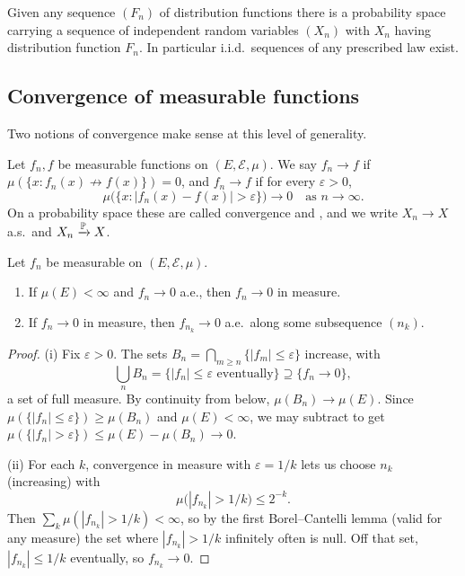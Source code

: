 \documentclass[a4paper]{scrartcl}
\newcommand{\cE}{\mathcal{E}}
\begin{document}
\begin{theorem}\label{thm:construct-iid}
	Given any sequence $(F_n)$ of distribution functions there is a probability space carrying a sequence of independent random variables $(X_n)$ with $X_n$ having distribution function $F_n$. In particular i.i.d.\ sequences of any prescribed law exist.
\end{theorem}

\subsection{Convergence of measurable functions}

Two notions of convergence make sense at this level of generality.

\begin{definition}
	Let $f_n, f$ be measurable functions on $(E,\cE,\mu)$. We say $f_n \to f$  if $\mu(\{x : f_n(x) \not\to f(x)\}) = 0$, and $f_n \to f$  if for every $\varepsilon > 0$,
	$$
	\mu\big( \{ x : |f_n(x) - f(x)| > \varepsilon\}\big) \to 0 \quad \text{as } n \to \infty.
	$$
	On a probability space these are called convergence  and , and we write $X_n \to X$ a.s.\ and $X_n \xrightarrow{\mathbb{P}} X$.
\end{definition}

\begin{theorem}\label{thm:ae-vs-measure}
	Let $f_n$ be measurable on $(E,\cE,\mu)$.
	\begin{enumerate}[label=(\roman*)]
		\item If $\mu(E) < \infty$ and $f_n \to 0$ a.e., then $f_n \to 0$ in measure.
		\item If $f_n \to 0$ in measure, then $f_{n_k} \to 0$ a.e.\ along some subsequence $(n_k)$.
	\end{enumerate}
\end{theorem}
\begin{proof}
	(i) Fix $\varepsilon > 0$. The sets $B_n = \bigcap_{m \geq n} \{|f_m| \leq \varepsilon\}$ increase, with
	$$
	\bigcup_n B_n = \{|f_n| \leq \varepsilon \text{ eventually}\} \supseteq \{f_n \to 0\},
	$$
	a set of full measure. By continuity from below, $\mu(B_n) \to \mu(E)$. Since $\mu(\{|f_n| \leq \varepsilon\}) \geq \mu(B_n)$ and $\mu(E) < \infty$, we may subtract to get $\mu(\{|f_n| > \varepsilon\}) \leq \mu(E) - \mu(B_n) \to 0$.

	(ii) For each $k$, convergence in measure with $\varepsilon = 1/k$ lets us choose $n_k$ (increasing) with
	$$
	\mu\big( |f_{n_k}| > 1/k \big) \leq 2^{-k}.
	$$
	Then $\sum_k \mu(|f_{n_k}| > 1/k) < \infty$, so by the first Borel--Cantelli lemma (valid for any measure) the set where $|f_{n_k}| > 1/k$ infinitely often is null. Off that set, $|f_{n_k}| \leq 1/k$ eventually, so $f_{n_k}\to 0$.
\end{proof}
\end{document}
